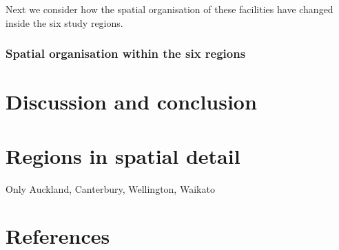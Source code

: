 \documentclass[3p, a4paper, authoryear, 11pt, fleqn, review]{elsarticle}
\newcommand{\nmt}[1]{{\color{ForestGreen}{~(nmt: #1)}}}
\begin{document}
Next we consider how the spatial organisation of these facilities have changed inside the six study regions.


\subsubsection{Spatial organisation within the six regions}

\nmt{NADIA CONTINUE HERE}






\section{Discussion and conclusion}
\label{sec:DiscConc}

\nmt{Remember to highlight methodological novelties}




\section{Regions in spatial detail}
Only Auckland, Canterbury, Wellington, Waikato

\section*{References}

\end{document}
